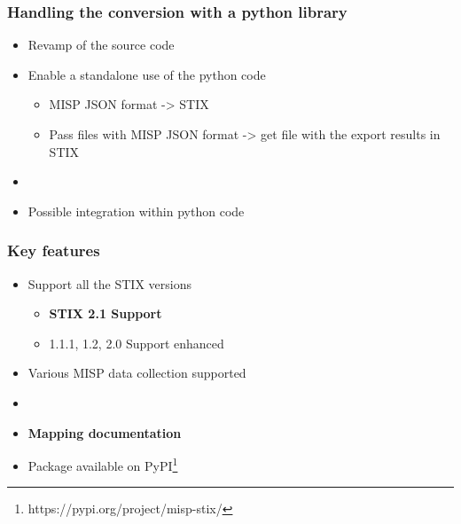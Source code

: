 \begin{frame}
    \frametitle{Handling the conversion with a python library}
    \begin{itemize}
        \item Revamp of the source code
        \item Enable a standalone use of the python code
        \begin{itemize}
            \item MISP JSON  format -> STIX
            \item Pass files with MISP JSON format -> get file with the export results in STIX
        \end{itemize}
        \item []
        \item Possible integration within python code
    \end{itemize}
\end{frame}

\begin{frame}
    \frametitle{Key features}
    \begin{itemize}
        \item Support all the STIX versions
        \begin{itemize}
            \item {\bf STIX 2.1 Support}
            \item 1.1.1, 1.2, 2.0 Support enhanced
        \end{itemize}
        \item Various MISP data collection supported
        \item[]
        \item {\bf Mapping documentation}
        \item Package available on PyPI\footnote{https://pypi.org/project/misp-stix/}
    \end{itemize}
\end{frame}

